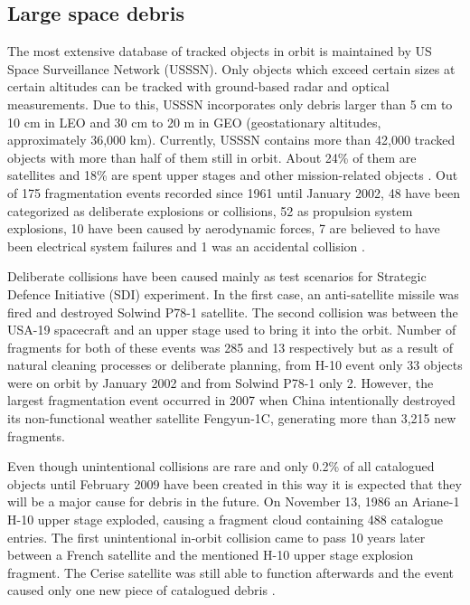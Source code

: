 \subsection{Large space debris}\label{subsec:large_space_debris}

	The most extensive database of tracked objects in orbit is maintained by US Space Surveillance Network (USSSN). Only objects which exceed certain sizes at certain altitudes can be tracked with ground-based radar and optical measurements. Due to this, USSSN incorporates only debris larger than 5 cm to 10 cm in LEO and 30 cm to 20 m in GEO (geostationary altitudes, approximately 36,000 km). Currently, USSSN contains more than 42,000 tracked objects with more than half of them still in orbit. About 24\% of them are satellites and 18\% are spent upper stages and other mission-related objects \citep{esabr336}. Out of 175 fragmentation events recorded since 1961 until January 2002, 48 have been categorized as deliberate explosions or collisions, 52 as propulsion system explosions, 10 have been caused by aerodynamic forces, 7 are believed to have been electrical system failures and 1 was an accidental collision \citep{klinkrad2006space}. 

	Deliberate collisions have been caused mainly as test scenarios for Strategic Defence Initiative (SDI) experiment. In the first case, an anti-satellite missile was fired and destroyed Solwind P78-1 satellite. The second collision was between the USA-19 spacecraft and an upper stage used to bring it into the orbit. Number of fragments for both of these events was 285 and 13 respectively but as a result of natural cleaning processes or deliberate planning, from H-10 event only 33 objects were on orbit by January 2002 and from Solwind P78-1 only 2. However, the largest fragmentation event occurred in 2007 when China intentionally destroyed its non-functional weather satellite Fengyun-1C, generating more than 3,215 new fragments. 
	
	Even though unintentional collisions are rare and only 0.2\% of all catalogued objects until February 2009 have been created in this way it is expected that they will be a major cause for debris in the future. On November 13, 1986 an Ariane-1 H-10 upper stage exploded, causing a fragment cloud containing 488 catalogue entries. The first unintentional in-orbit collision came to pass 10 years later between a French satellite and the mentioned H-10 upper stage explosion fragment. The Cerise satellite was still able to function afterwards and the event caused only one new piece of catalogued debris \citep{Silha2012id}. 
	
